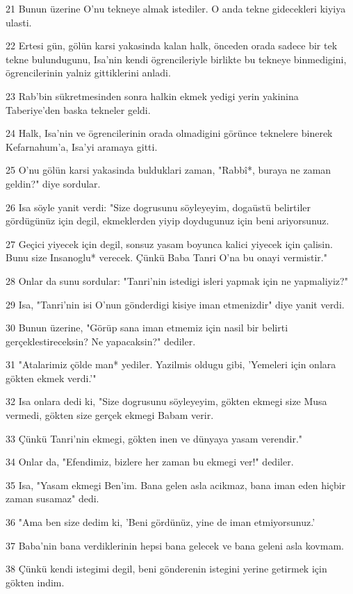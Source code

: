 \par 21 Bunun üzerine O'nu tekneye almak istediler. O anda tekne gidecekleri kiyiya ulasti.
\par 22 Ertesi gün, gölün karsi yakasinda kalan halk, önceden orada sadece bir tek tekne bulundugunu, Isa'nin kendi ögrencileriyle birlikte bu tekneye binmedigini, ögrencilerinin yalniz gittiklerini anladi.
\par 23 Rab'bin sükretmesinden sonra halkin ekmek yedigi yerin yakinina Taberiye'den baska tekneler geldi.
\par 24 Halk, Isa'nin ve ögrencilerinin orada olmadigini görünce teknelere binerek Kefarnahum'a, Isa'yi aramaya gitti.
\par 25 O'nu gölün karsi yakasinda bulduklari zaman, "Rabbî*, buraya ne zaman geldin?" diye sordular.
\par 26 Isa söyle yanit verdi: "Size dogrusunu söyleyeyim, dogaüstü belirtiler gördügünüz için degil, ekmeklerden yiyip doydugunuz için beni ariyorsunuz.
\par 27 Geçici yiyecek için degil, sonsuz yasam boyunca kalici yiyecek için çalisin. Bunu size Insanoglu* verecek. Çünkü Baba Tanri O'na bu onayi vermistir."
\par 28 Onlar da sunu sordular: "Tanri'nin istedigi isleri yapmak için ne yapmaliyiz?"
\par 29 Isa, "Tanri'nin isi O'nun gönderdigi kisiye iman etmenizdir" diye yanit verdi.
\par 30 Bunun üzerine, "Görüp sana iman etmemiz için nasil bir belirti gerçeklestireceksin? Ne yapacaksin?" dediler.
\par 31 "Atalarimiz çölde man* yediler. Yazilmis oldugu gibi, 'Yemeleri için onlara gökten ekmek verdi.'"
\par 32 Isa onlara dedi ki, "Size dogrusunu söyleyeyim, gökten ekmegi size Musa vermedi, gökten size gerçek ekmegi Babam verir.
\par 33 Çünkü Tanri'nin ekmegi, gökten inen ve dünyaya yasam verendir."
\par 34 Onlar da, "Efendimiz, bizlere her zaman bu ekmegi ver!" dediler.
\par 35 Isa, "Yasam ekmegi Ben'im. Bana gelen asla acikmaz, bana iman eden hiçbir zaman susamaz" dedi.
\par 36 "Ama ben size dedim ki, 'Beni gördünüz, yine de iman etmiyorsunuz.'
\par 37 Baba'nin bana verdiklerinin hepsi bana gelecek ve bana geleni asla kovmam.
\par 38 Çünkü kendi istegimi degil, beni gönderenin istegini yerine getirmek için gökten indim.
